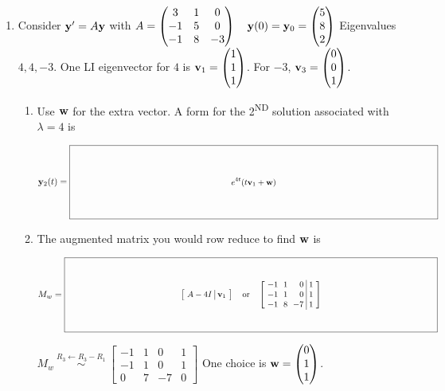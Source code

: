 \documentclass[11pt,letterpaper]{article}
\newcommand{\keybox}[3]{%
  \vcenter{\hbox{$\boxed{\parbox[c][#2][c]{#1}{\centering\small
    \setlength{\arraycolsep}{3pt}\ensuremath{\displaystyle #3}}}$}}}
\begin{document}
\begin{enumerate}
\item Consider $\mathbf{y}'=A\mathbf{y}$ with
$A=\begin{pmatrix}3&1&0\\-1&5&0\\-1&8&-3\end{pmatrix}\quad \mathbf{y}(0)=\mathbf{y}_0=\begin{pmatrix}5\\8\\2\end{pmatrix}$\newline
Eigenvalues $4,4,-3$. \quad One LI eigenvector for $4$ is $\mathbf{v}_1=\begin{pmatrix}1\\1\\1\end{pmatrix}$. \quad For $-3$, $\mathbf{v}_3=\begin{pmatrix}0\\0\\1\end{pmatrix}$.
\begin{enumerate}
\item Use $\mathbf{w}$ for the extra vector. A form for the 2\textsuperscript{ND} solution associated with $\lambda=4$ is
\par $\vect{y}_2(t)=\keybox{5.65in}{1.05in}{e^{4t}(t\vect{v}_1+\vect{w})}$
\vfill
\item The augmented matrix you would row reduce to find $\mathbf{w}$ is
\par $M_w=\keybox{5.65in}{1.05in}{\left[\begin{array}{c|c}A-4I&\vect{v}_1\end{array}\right]
\quad\text{or}\quad
\left[\begin{array}{rrr|r}-1&1&0&1\\-1&1&0&1\\-1&8&-7&1\end{array}\right]}$
\par{\footnotesize $M_w\ \overset{R_3\gets R_3-R_1}{\sim}\
\left[\begin{array}{rrr|r}
-1&1&0&1\\-1&1&0&1\\0&7&-7&0
\end{array}\right]$
\qquad One choice is $\mathbf{w}=\begin{pmatrix}0\\1\\1\end{pmatrix}$.}

\end{enumerate}
\end{enumerate}
\end{document}
